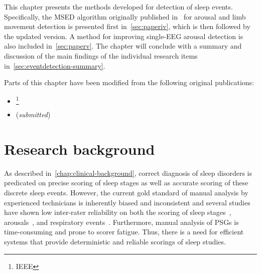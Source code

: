 \vspace{6cm}

This chapter presents the methods developed for detection of sleep events.
Specifically, the \ac{MSED} algorithm originally published in~\cite{Olesen2019} for arousal and limb movement detection is presented first in~\cref{sec:paperiv}, which is then followed by the updated version. A method for improving single-\ac{EEG} arousal detection is also included in~\cref{sec:paperv}. The chapter will conclude with a summary and discussion of the main findings of the individual research items in~\cref{sec:eventdetection-summary}.

Parts of this chapter have been modified from the following original publications:
\begin{itemize}
    \item {}\footnote{ IEEE}
    \item {} (\textit{submitted})
\end{itemize}


\section{Research background}

As described in~\cref{chap:clinical-background}, correct diagnosis of sleep disorders is predicated on precise scoring of sleep stages as well as accurate scoring of these discrete sleep events. 
However, the current gold standard of manual analysis by experienced technicians is inherently biased and inconsistent and several studies have shown low inter-rater reliability on both the scoring of sleep stages~\cite{Norman2000,Rosenberg2013,Younes2016}, arousals~\cite{Bonnet2007}, and respiratory events~\cite{Rosenberg2014}. 
Furthermore, manual analysis of \acsp{PSG} is time-consuming and prone to scorer fatigue. 
Thus, there is a need for efficient systems that provide deterministic and reliable scorings of sleep studies.

